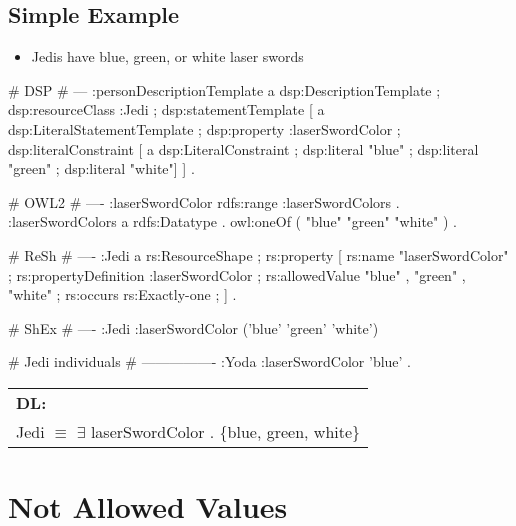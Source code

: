\documentclass{llncs}
\newenvironment{DL}{
  \scriptsize
  \sffamily
  \vspace{0.3cm}
  \begin{tabular}{l}
	\textbf{DL:} \\

}{
  \end{tabular}
  \linebreak
}
\newcommand{\tb}[1]{\todo[size=\small, color=blue!40]{\textbf{Thomas:} #1}}
\begin{document}
\subsection{Simple Example}

\begin{itemize}
	\item Jedis have blue, green, or white laser swords
\end{itemize}

\begin{ex}
# DSP
# ---
:personDescriptionTemplate
    a dsp:DescriptionTemplate ;
    dsp:resourceClass :Jedi ;
    dsp:statementTemplate [
        a dsp:LiteralStatementTemplate ;
        dsp:property :laserSwordColor ;
        dsp:literalConstraint [
            a dsp:LiteralConstraint ;
            dsp:literal "blue" ;
            dsp:literal "green" ;
            dsp:literal "white"] ] .
\end{ex}

\begin{ex}
# OWL2
# ----
:laserSwordColor rdfs:range :laserSwordColors . 
:laserSwordColors
    a rdfs:Datatype .
    owl:oneOf ( "blue" "green" "white" ) .
\end{ex}

\begin{ex}
# ReSh
# ----
:Jedi a rs:ResourceShape ;
    rs:property [
        rs:name "laserSwordColor" ;
        rs:propertyDefinition :laserSwordColor ;
        rs:allowedValue "blue" , "green" , "white" ;
        rs:occurs rs:Exactly-one ;
    ] .
\end{ex}

\begin{ex}
# ShEx
# ----
:Jedi {
    :laserSwordColor ('blue' 'green' 'white') }
\end{ex}

\begin{ex}
# Jedi individuals
# ----------------
:Yoda 
    :laserSwordColor 'blue' .
\end{ex}

\begin{DL}
Jedi $\equiv$ $\exists$ laserSwordColor . \{blue, green, white\} \\
\end{DL}


\section{Not Allowed Values}
\end{document}
